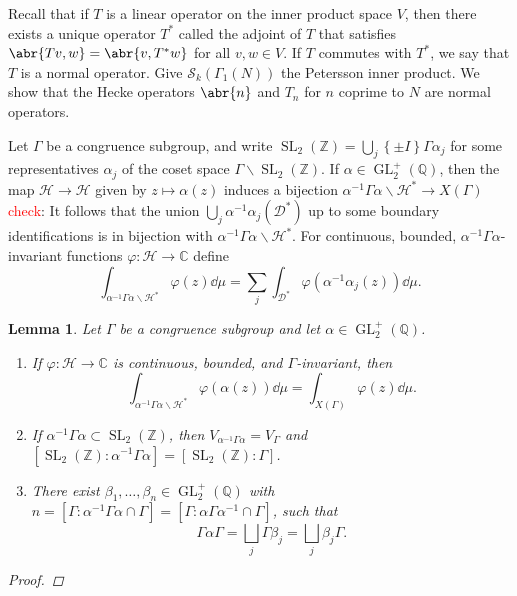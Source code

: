 \documentclass[10pt,leqno,twoside]{article}
\theoremstyle{plain}
\newtheorem{lemma}[lem]{Lemma}
\theoremstyle{definition}
\numberwithin{equation}{section}
\numberwithin{lem}{section}
\newcommand{\cbr}[1]{\left\{#1\right\}}
\newcommand{\textib}[1]{\textbf{\textit{#1\index{#1}}}} %
\DeclareMathOperator{\GL}{GL}
\DeclareMathOperator{\SL}{SL}
\newcommand{\slz}{\SL_2(\mathbb{Z})}
\newcommand{\glqp}{\GL_2^+(\mathbb{Q})}
\newcommand{\tbd}{{\Huge\color{red}{\textib{TBD}}}}
\newcommand{\sai}[1]{\textcolor{red}{#1}}
\begin{document}
Recall that if $T$ is a linear operator on the inner product space $V$, then there exists a unique operator $T^\ast$ called the adjoint of $T$ that satisfies $\abr{Tv,w} = \abr{v,T^\ast w}$ for all $v,w\in V$. If $T$ commutes with $T^\ast$, we say that $T$ is a normal operator. Give $\mathcal S_k(\varGamma_1(N))$ the Petersson inner product. We show that the Hecke operators $\abr{n}$ and $T_n$ for $n$ coprime to $N$ are normal operators.

Let $\varGamma$ be a congruence subgroup, and write $\slz = \bigcup_j\cbr{\pm I}\varGamma \alpha_j$ for some representatives $\alpha_j$ of the coset space $\varGamma\backslash \slz$. If $\alpha\in\glqp$, then the map $\mathcal H\to\mathcal H$ given by $z \mapsto \alpha(z)$ induces a bijection $\alpha^{-1}\varGamma\alpha\backslash \mathcal H^\ast\to X(\varGamma)$ \tbd\sai{check}: It follows that the union $\bigcup_j \alpha^{-1}\alpha_j(\mathcal D^\ast)$ up to some boundary identifications is in bijection with $\alpha^{-1}\varGamma\alpha\backslash \mathcal H^\ast$. For continuous, bounded, $\alpha^{-1}\varGamma\alpha$-invariant functions $\varphi\colon \mathcal H\to \mathbb C$ define
\[\int_{\alpha^{-1}\varGamma\alpha\backslash \mathcal H^\ast}\varphi(z)\dd\mu = \sum_j \int_{\mathcal D^\ast}\varphi(\alpha^{-1}\alpha_j(z))\dd\mu.\]

\begin{lemma}
    Let $\varGamma$ be a congruence subgroup and let $\alpha\in\glqp$.\begin{enumerate}[label = \textup{(\alph*)}]
        \item If $\varphi\colon\mathcal H\to\mathbb C$ is continuous, bounded, and $\varGamma$-invariant, then \[\int_{\alpha^{-1}\varGamma\alpha\backslash \mathcal H^\ast}\varphi(\alpha(z))\dd\mu = \int_{X(\varGamma)}\varphi(z)\dd\mu.\]
        \item If $\alpha^{-1}\varGamma\alpha\subset \slz$, then $V_{\alpha^{-1}\varGamma\alpha} = V_\varGamma$ and $[\slz : \alpha^{-1}\varGamma\alpha] = [\slz : \varGamma]$.
        \item There exist $\beta_1,\dots,\beta_n\in \glqp$ with $n=[\varGamma : \alpha^{-1}\varGamma\alpha\cap\varGamma] = [\varGamma : \alpha\varGamma\alpha^{-1}\cap \varGamma]$, such that \[\varGamma\alpha\varGamma = \bigsqcup_j\varGamma \beta_j = \bigsqcup_j\beta_j\varGamma.\]
    \end{enumerate}
    \begin{proof}
        \tbd
    \end{proof}
\end{lemma}
\end{document}
